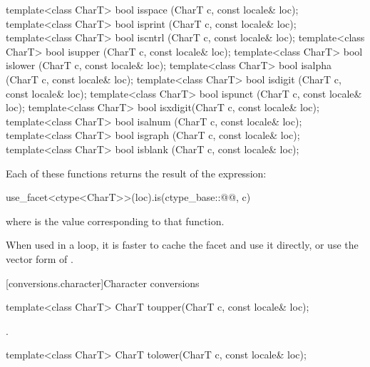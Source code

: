 %
%
%
%
%
%
%
%
%
%
%
%
\begin{itemdecl}
template<class CharT> bool isspace (CharT c, const locale& loc);
template<class CharT> bool isprint (CharT c, const locale& loc);
template<class CharT> bool iscntrl (CharT c, const locale& loc);
template<class CharT> bool isupper (CharT c, const locale& loc);
template<class CharT> bool islower (CharT c, const locale& loc);
template<class CharT> bool isalpha (CharT c, const locale& loc);
template<class CharT> bool isdigit (CharT c, const locale& loc);
template<class CharT> bool ispunct (CharT c, const locale& loc);
template<class CharT> bool isxdigit(CharT c, const locale& loc);
template<class CharT> bool isalnum (CharT c, const locale& loc);
template<class CharT> bool isgraph (CharT c, const locale& loc);
template<class CharT> bool isblank (CharT c, const locale& loc);
\end{itemdecl}

\pnum
Each of these functions 
returns the result of the expression:
\begin{codeblock}
use_facet<ctype<CharT>>(loc).is(ctype_base::@@, c)
\end{codeblock}
where  is the  value
corresponding to that function.
\begin{footnote}
When used in a loop,
it is faster to cache the  facet and use it directly, or
use the vector form of .
\end{footnote}

[conversions.character]{Character conversions}

%
\begin{itemdecl}
template<class CharT> CharT toupper(CharT c, const locale& loc);
\end{itemdecl}

\begin{itemdescr}
\pnum
\returns
{}.
\end{itemdescr}

%
\begin{itemdecl}
template<class CharT> CharT tolower(CharT c, const locale& loc);
\end{itemdecl}

